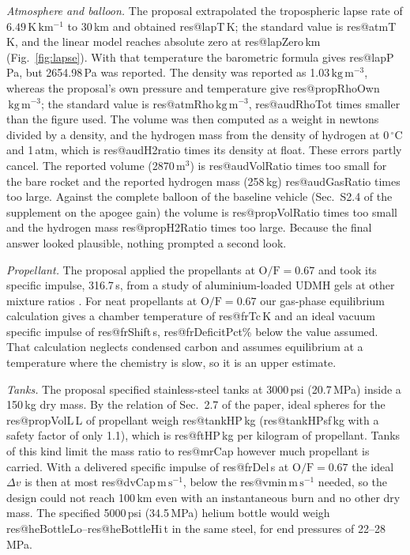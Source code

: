 \documentclass[11pt,a4paper]{article}
\makeatletter
\newcommand{\R}[1]{\csname res@#1\endcsname}
\newcommand{\ms}{\,\mathrm{m\,s^{-1}}}
\newcommand{\kgm}{\,\mathrm{kg\,m^{-3}}}
\makeatother
\begin{document}
\emph{Atmosphere and balloon.} The proposal extrapolated the tropospheric lapse rate of $6.49\,\mathrm{K\,km^{-1}}$ to 30\,km and obtained \R{lapT}\,K; the standard value is \R{atmT}\,K, and the linear model reaches absolute zero at \R{lapZero}\,km (Fig.~\ref{fig:lapse}). With that temperature the barometric formula gives \R{lapP}\,Pa, but 2654.98\,Pa was reported. The density was reported as 1.03$\kgm$, whereas the proposal's own pressure and temperature give \R{propRhoOwn}$\kgm$; the standard value is \R{atmRho}$\kgm$, \R{audRhoTot} times smaller than the figure used. The volume was then computed as a weight in newtons divided by a density, and the hydrogen mass from the density of hydrogen at 0\,$^\circ$C and 1\,atm, which is \R{audH2ratio} times its density at float. These errors partly cancel. The reported volume (2870\,m$^3$) is \R{audVolRatio} times too small for the bare rocket and the reported hydrogen mass (258\,kg) \R{audGasRatio} times too large. Against the complete balloon of the baseline vehicle (Sec.~S2.4 of the supplement on the apogee gain) the volume is \R{propVolRatio} times too small and the hydrogen mass \R{propH2Ratio} times too large. Because the final answer looked plausible, nothing prompted a second look.

\emph{Propellant.} The proposal applied the propellants at $\mathrm{O/F}=0.67$ and took its specific impulse, 316.7\,s, from a study of aluminium-loaded UDMH gels at other mixture ratios \cite{varghese1999}. For neat propellants at $\mathrm{O/F}=0.67$ our gas-phase equilibrium calculation gives a chamber temperature of \R{frTc}\,K and an ideal vacuum specific impulse of \R{frShift}\,s, \R{frDeficitPct}\% below the value assumed. That calculation neglects condensed carbon and assumes equilibrium at a temperature where the chemistry is slow, so it is an upper estimate.

\emph{Tanks.} The proposal specified stainless-steel tanks at 3000\,psi (20.7\,MPa) inside a 150\,kg dry mass. By the relation of Sec.~2.7 of the paper, ideal spheres for the \R{propVolL}\,L of propellant weigh \R{tankHP}\,kg (\R{tankHPsf}\,kg with a safety factor of only 1.1), which is \R{ftHP}\,kg per kilogram of propellant. Tanks of this kind limit the mass ratio to \R{mrCap} however much propellant is carried. With a delivered specific impulse of \R{frDel}\,s at $\mathrm{O/F}=0.67$ the ideal $\Delta v$ is then at most \R{dvCap}$\ms$, below the \R{vmin}$\ms$ needed, so the design could not reach 100\,km even with an instantaneous burn and no other dry mass. The specified 5000\,psi (34.5\,MPa) helium bottle would weigh \R{heBottleLo}--\R{heBottleHi}\,t in the same steel, for end pressures of 22--28\,MPa.
\end{document}
